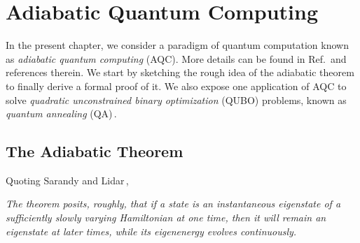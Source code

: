 
\chapter{Adiabatic Quantum Computing} %

\label{Chapter2} %
In the present chapter, we consider a paradigm of quantum computation known as \textit{adiabatic quantum computing} (AQC). More details can be found in Ref.\,\cite{Farhi2000QuantumEvolution} and references therein. We start by sketching the rough idea of the adiabatic theorem to finally derive a formal proof of it. We also expose one application of AQC to solve \textit{quadratic unconstrained binary optimization} (QUBO) problems, known as \textit{quantum annealing} (QA)\,\cite{Kadowaki1998QuantumModel}.

\section{The Adiabatic Theorem}
Quoting Sarandy and Lidar\,\cite{Sarandy2005AdiabaticSystems},
\begin{displayquote}
\textit{The theorem posits, roughly, that if a state is an instantaneous eigenstate of a sufficiently slowly varying Hamiltonian at one time, then it will remain an eigenstate at later times, while its eigenenergy evolves continuously.}
\end{displayquote}
